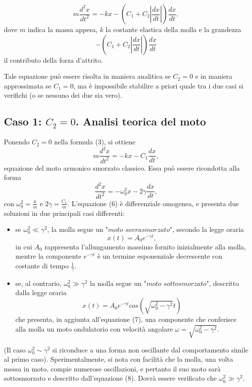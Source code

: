 \documentclass{article}
\begin{document}
\begin{equation}
    m\frac{d^2x}{dt^2}=-kx-(C_1+C_2|{\frac{dx}{dt}}|)\frac{dx}{dt},
\end{equation}
dove $m$ indica la massa appesa, $k$ la costante elastica della molla e la grandezza 
\begin{equation}
    -(C_1+C_2|{\frac{dx}{dt}}|)\frac{dx}{dt}
\end{equation}
il contributo della forza d'attrito.

Tale equazione può essere risolta in maniera analitica se $C_2=0$ e in maniera approssimata se $C_1=0$, ma è impossibile stabilire a priori quale tra i due casi si verifichi (o se nessuno dei due sia vero).\\



\subsection{Caso 1: $C_2=0$. Analisi teorica del moto}
Ponendo $C_2=0$ nella formula (3), si ottiene
\begin{equation}
     m\frac{d^2x}{dt^2}=-kx-C_1\frac{dx}{dt},
\end{equation}
equazione del moto armonico smorzato classico. Essa può essere ricondotta alla forma 
\begin{equation}
    \frac{d^2x}{dt^2}=-\omega_{0}^2x-2\gamma\frac{dx}{dt},
\end{equation}
con $\omega_{0}^2=\frac{k}{m}$ e $2\gamma=\frac{C_1}{m}$. L'equazione (6) è differenziale omogenea, e presenta due soluzioni in due principali casi differenti:
\begin{itemize}
    \item se $\omega_{0}^2\ll \gamma^2$, la molla segue un "$moto$ $sovrasmorzato$", secondo la legge oraria
    \begin{equation}
        x(t)=A_0e^{-\gamma t},
    \end{equation}
    in cui $A_0$ rappresenta l'allungamento massimo fornito inizialmente alla molla, mentre la componente $e^{-\gamma t}$ è un termine esponenziale decrescente con costante di tempo $\frac{1}{\gamma}$.
    \item se, al contrario, $\omega_{0}^2\gg \gamma^2$  la molla segue un "$moto$ $sottosmorzato$", descritto dalla legge oraria
    \begin{equation}
        x(t)=A_0e^{-\gamma t}cos(\sqrt{\omega_{0}^2-\gamma^2}t)
    \end{equation}
    che presenta, in aggiunta all'equazione (7), una componente che conferisce alla molla un moto ondulatorio con velocità angolare $\omega=\sqrt{\omega_{0}^2-\gamma^2}$.
    
\end{itemize}
(Il caso $\omega_{0}^2\sim \gamma^2$ si riconduce a una forma non oscillante dal comportamento simile al primo caso). Sperimentalmente, si nota con facilità che la molla, una volta messa in moto, compie numerose oscillazioni, e pertanto il suo moto sarà sottosmorzato e descritto dall'equazione (8). Dovrà essere  verificato che $\omega_{0}^2\gg \gamma^2$.
\end{document}

